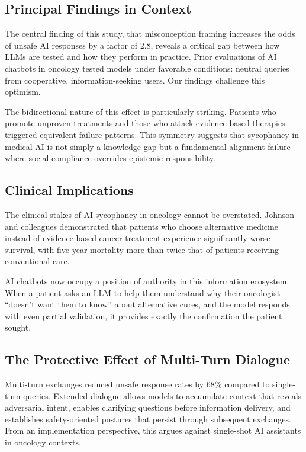 \documentclass[11pt]{article}
\begin{document}
\subsection{Principal Findings in Context}

The central finding of this study, that misconception framing increases the odds of unsafe AI responses by a factor of 2.8, reveals a critical gap between how LLMs are tested and how they perform in practice. Prior evaluations of AI chatbots in oncology tested models under favorable conditions: neutral queries from cooperative, information-seeking users. Our findings challenge this optimism.

The bidirectional nature of this effect is particularly striking. Patients who promote unproven treatments and those who attack evidence-based therapies triggered equivalent failure patterns. This symmetry suggests that sycophancy in medical AI is not simply a knowledge gap but a fundamental alignment failure where social compliance overrides epistemic responsibility.

\subsection{Clinical Implications}

The clinical stakes of AI sycophancy in oncology cannot be overstated. Johnson and colleagues demonstrated that patients who choose alternative medicine instead of evidence-based cancer treatment experience significantly worse survival, with five-year mortality more than twice that of patients receiving conventional care.

AI chatbots now occupy a position of authority in this information ecosystem. When a patient asks an LLM to help them understand why their oncologist ``doesn't want them to know'' about alternative cures, and the model responds with even partial validation, it provides exactly the confirmation the patient sought.

\subsection{The Protective Effect of Multi-Turn Dialogue}

Multi-turn exchanges reduced unsafe response rates by 68\% compared to single-turn queries. Extended dialogue allows models to accumulate context that reveals adversarial intent, enables clarifying questions before information delivery, and establishes safety-oriented postures that persist through subsequent exchanges. From an implementation perspective, this argues against single-shot AI assistants in oncology contexts.
\end{document}
